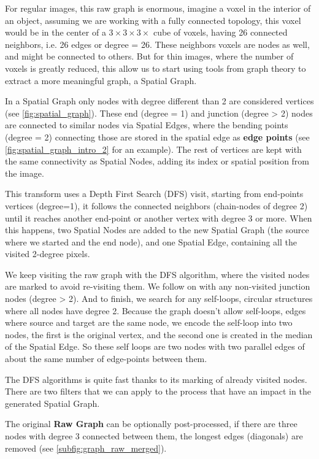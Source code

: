 For regular images, this raw graph is enormous, imagine a voxel in the interior of an object, assuming we are working with a fully connected topology, this voxel would be in the center of a $3\times3\times3\times$ cube of voxels, having 26 connected neighbors, i.e. 26 edges or degree = 26. These neighbors voxels are nodes as well, and might be connected to others.
But for thin images, where the number of voxels is greatly reduced, this allow us to start using tools from graph theory to extract a more meaningful graph, a \gls{Spatial Graph}.

In a \gls{Spatial Graph} only nodes with degree different than 2 are considered vertices (see \autoref{fig:spatial_graph}). These end (degree = 1) and junction (degree > 2) nodes are connected to similar nodes via \glspl{Spatial Edge}, where the bending points (degree = 2) connecting those are stored in the spatial edge as \textbf{edge points} (see \autoref{fig:spatial_graph_intro_2} for an example). The rest of vertices are kept with the same connectivity as \glspl{Spatial Node}, adding its index or spatial position from the image.

This transform uses a Depth First Search (\gls{DFS}) visit, starting from end-points vertices (degree=1), it follows the connected neighbors (chain-nodes of degree 2) until it reaches another end-point or another vertex with degree 3 or more. When this happens, two \glspl{Spatial Node} are added to the new \gls{Spatial Graph} (the source where we started and the end node), and one \gls{Spatial Edge}, containing all the visited 2-degree pixels.

We keep visiting the raw graph with the \gls{DFS} algorithm, where the visited nodes are marked to avoid re-visiting them. We follow on with any non-visited junction nodes (degree > 2). And to finish, we search for any self-loops, circular structures where all nodes have degree 2. Because the graph doesn't allow self-loops, edges where source and target are the same node, we encode the self-loop into two nodes, the first is the original vertex, and the second one is created in the median of the \gls{Spatial Edge}. So these self loops are two nodes with two parallel edges of about the same number of edge-points between them.

The \gls{DFS} algorithms is quite fast thanks to its marking of already visited nodes. There are two filters that we can apply to the process that have an impact in the generated \gls{Spatial Graph}.

The original \textbf{Raw Graph} can be optionally post-processed, if there are three nodes with degree 3 connected between them, the longest edges (diagonals) are removed (see \autoref{subfig:graph_raw_merged}).


